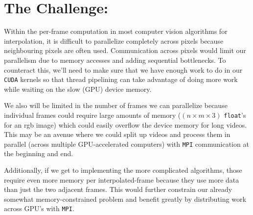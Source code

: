 \documentclass[12pt]{article}
\begin{document}
\section*{The Challenge:}
\par Within the per-frame computation in most computer vision algorithms for interpolation, it is difficult to parallelize completely across pixels because neighbouring pixels are often used. Communication across pixels would limit our parallelism due to memory accesses and adding sequential bottlenecks. To counteract this, we'll need to make sure that we have enough work to do in our \texttt{CUDA} kernels so that thread pipelining can take advantage of doing more work while waiting on the slow (GPU) device memory. 
\par We also will be limited in the number of frames we can parallelize because individual frames could require large amounts of memory ($(n \times m \times 3)$ \texttt{float}'s for an rgb image) which could easily overflow the device memory for long videos. This may be an avenue where we could split up videos and process them in parallel (across multiple GPU-accelerated computers) with \texttt{MPI} communication at the beginning and end. 
\par Additionally, if we get to implementing the more complicated algorithms, those require even more memory per interpolated-frame because they use more data than just the two adjacent frames. This would further constrain our already somewhat memory-constrained problem and benefit greatly by distributing work across GPU's with \texttt{MPI}.
\end{document}

